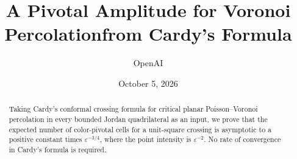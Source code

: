 \documentclass[11pt]{article}
\title{A Pivotal Amplitude for Voronoi Percolation\newline from Cardy's Formula}
\author{OpenAI}
\date{October 5, 2026}
\theoremstyle{definition}
\theoremstyle{remark}
\newcommand{\eps}{\varepsilon}
\numberwithin{equation}{section}
\begin{document}
\maketitle
\begin{abstract}
Taking Cardy's conformal crossing formula for critical planar
Poisson--Voronoi percolation in every bounded Jordan quadrilateral as an
input, we prove that the expected number of color-pivotal cells for a
unit-square crossing is asymptotic to a positive constant times
$\eps^{-3/4}$, where the point intensity is $\eps^{-2}$.
No rate of convergence in Cardy's formula is required.
\end{abstract}
\setcounter{tocdepth}{1}
\tableofcontents
\clearpage








\end{document}

